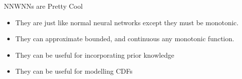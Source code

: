 \documentclass[dvipsnames,handout, notes]{beamer}
\begin{document}
\begin{frame}{NNWNNs are Pretty Cool}
	\begin{itemize}
		\item They are just like normal neural networks except they must be monotonic.
		\item They can approximate bounded, and continuous any monotonic function.
		\item They can be useful for incorporating prior knowledge
		\item They can be useful for modelling CDFs

	\end{itemize}
\end{frame}
\end{document}
